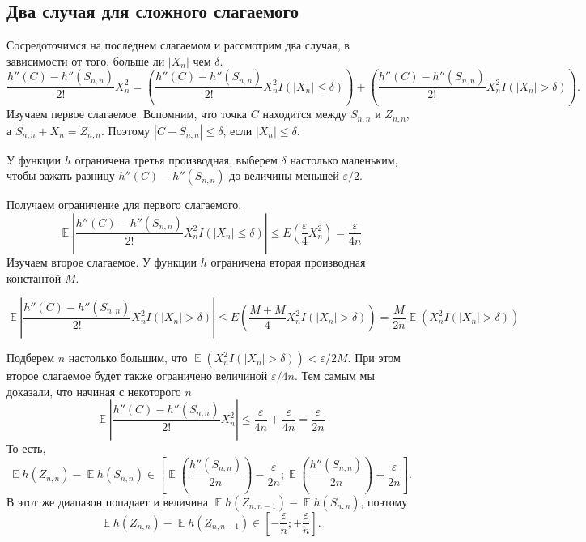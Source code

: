 \documentclass[
  letterpaper,
  DIV=11,
  numbers=noendperiod]{scrartcl}
\begin{document}
\subsection{Два случая для сложного слагаемого}\label{sec-two-subcases}

Сосредоточимся на последнем слагаемом и рассмотрим два случая, в
зависимости от того, больше ли \(\left\lvert X_n \right\rvert\) чем
\(\delta\). \[
\frac{h''(C) - h''(S_{n,n})}{2!}X_n^2 = \left(\frac{h''(C) - h''(S_{n,n})}{2!}X_n^2I(\left\lvert X_n \right\rvert \leq \delta)\right) + \left(\frac{h''(C) - h''(S_{n,n})}{2!}X_n^2I(\left\lvert X_n \right\rvert > \delta)\right).
\] Изучаем первое слагаемое. Вспомним, что точка \(C\) находится между
\(S_{n,n}\) и \(Z_{n,n}\), а \(S_{n,n} + X_n = Z_{n,n}\). Поэтому
\(\left\lvert C - S_{n,n} \right\rvert \leq \delta\), если
\(\left\lvert X_n \right\rvert\leq \delta\).

У функции \(h\) ограничена третья производная, выберем \(\delta\)
настолько маленьким, чтобы зажать разницу \(h''(C) - h''(S_{n,n})\) до
величины меньшей \(\varepsilon/2\).

Получаем ограничение для первого слагаемого, \[
\mathop{\mathrm{\mathbb{E}}}\left\lvert \frac{h''(C) - h''(S_{n,n})}{2!}X_n^2I(\left\lvert X_n \right\rvert \leq \delta) \right\rvert \leq E\left(\frac{\varepsilon}{4}X_n^2\right)=\frac{\varepsilon}{4n}
\] Изучаем второе слагаемое. У функции \(h\) ограничена вторая
производная константой \(M\).

\[
\mathop{\mathrm{\mathbb{E}}}\left\lvert \frac{h''(C) - h''(S_{n,n})}{2!}X_n^2I(\left\lvert X_n \right\rvert > \delta) \right\rvert \leq E\left(\frac{M + M}{4}X_n^2I(\left\lvert X_n \right\rvert > \delta)\right)=\frac{M}{2n}\mathop{\mathrm{\mathbb{E}}}(X_n^2I(\left\lvert X_n \right\rvert > \delta))
\]

Подберем \(n\) настолько большим, что
\(\mathop{\mathrm{\mathbb{E}}}(X_n^2 I(\left\lvert X_n \right\rvert > \delta)) < \varepsilon/2M\).
При этом второе слагаемое будет также ограничено величиной
\(\varepsilon/4n\). Тем самым мы доказали, что начиная с некоторого
\(n\) \[
\mathop{\mathrm{\mathbb{E}}}\left\lvert \frac{h''(C) - h''(S_{n,n})}{2!}X_n^2  \right\rvert \leq \frac{\varepsilon}{4n} + \frac{\varepsilon}{4n} = \frac{\varepsilon}{2n}
\] То есть, \[
\mathop{\mathrm{\mathbb{E}}}h(Z_{n,n}) - \mathop{\mathrm{\mathbb{E}}}h(S_{n,n}) \in \left[ \mathop{\mathrm{\mathbb{E}}}\left(\frac{h''(S_{n,n})}{2n}\right) - \frac{\varepsilon}{2n}; \mathop{\mathrm{\mathbb{E}}}\left(\frac{h''(S_{n,n})}{2n}\right) + \frac{\varepsilon}{2n} \right].
\] В этот же диапазон попадает и величина
\(\mathop{\mathrm{\mathbb{E}}}h(Z_{n,n-1}) - \mathop{\mathrm{\mathbb{E}}}h(S_{n,n})\),
поэтому \[
\mathop{\mathrm{\mathbb{E}}}h(Z_{n,n}) - \mathop{\mathrm{\mathbb{E}}}h(Z_{n,n-1}) \in \left[ - \frac{\varepsilon}{n}; + \frac{\varepsilon}{n} \right].
\]
\end{document}
